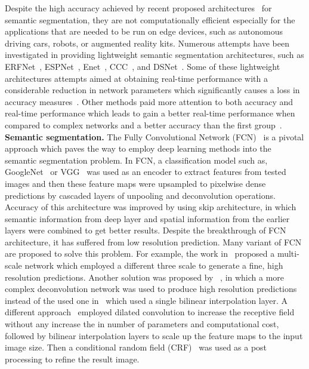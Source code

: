 \documentclass[conference,a4paper]{IEEEtran}
\begin{document}
Despite the high accuracy achieved by recent proposed architectures~\cite{deeplabv3plus,zhao2017pspnet} for semantic segmentation, they are not computationally efficient especially for the applications that are needed to be run on edge devices, such as autonomous driving cars, robots, or augmented reality kits. Numerous attempts have been investigated in providing lightweight semantic segmentation architectures, such as ERFNet~\cite{erfnet}, ESPNet~\cite{espnet}, Enet~\cite{enet}, CCC~\cite{ccc2}, and DSNet~\cite{dsnet}. Some of these lightweight architectures attempts aimed at obtaining real-time performance with a considerable reduction in network parameters which significantly causes a loss in accuracy measures~\cite{espnet, enet, rtseg,ccc2}. Other methods paid more attention to both accuracy and real-time performance which leads to gain a better real-time performance when compared to complex networks and a better accuracy than the first group~\cite{erfnet, dsnet}. 
\\
\textbf{Semantic segmentation.} The Fully Convolutional Network (FCN)~\cite{long2015fully} is a pivotal approach which paves the way to employ deep learning methods into the semantic segmentation problem. In FCN, a classification model such as, GoogleNet~\cite{szegedy2015going} or VGG~\cite{simonyan2014very} was used as an encoder to extract features from tested images and then these feature maps were upsampled to pixelwise dense predictions by cascaded layers of unpooling and deconvolution operations. Accuracy of this architecture was improved by using skip architecture, in which semantic information from deep layer and spatial information from the earlier layers were combined to get better results. Despite the breakthrough of FCN architecture, it has suffered from low resolution prediction. Many variant of FCN are proposed to solve this problem. For example, the work in~\cite{eigen2015predicting} proposed a multi-scale network which employed a different three scale to generate a fine, high resolution predictions. Another solution was proposed by ~\cite{noh2015learning}, in which a more complex deconvolution network was used to produce high resolution predictions instead of the used one in~\cite{long2015fully} which used a single bilinear interpolation layer. A different approach~\cite{chen2018deeplab} employed dilated convolution to increase the receptive field without any increase the in number of parameters and computational cost, followed by bilinear interpolation layers to scale up the feature maps to the input image size. Then a conditional random field (CRF)~\cite{krahenbuhl2011efficient} was used as a post processing to refine the result image.
\end{document}
